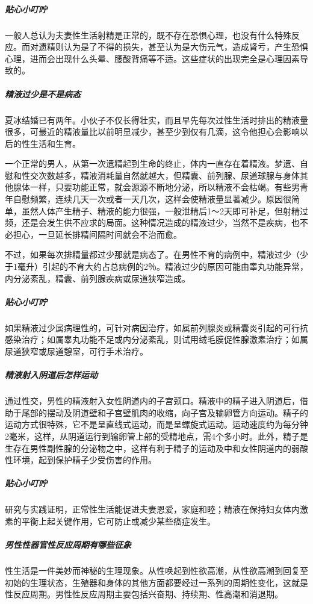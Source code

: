 \subparagraph{贴心小叮咛}

一般人总认为夫妻性生活射精是正常的，既不存在恐惧心理，也没有什么特殊反应。而对遗精则认为是了不得的损失，甚至认为是大伤元气，造成肾亏，产生恐惧心理，进而会出现什么头晕、腰酸背痛等不适。这些症状的出现完全是心理因素导致的。

\subparagraph{精液过少是不是病态}

夏冰结婚已有两年。小伙子不仅长得壮实，而且早先每次过性生活时排出的精液量很多，可最近的精液量比以前明显减少，甚至少到仅有几滴，这令他担心会影响以后的性生活和生育。

一个正常的男人，从第一次遗精起到生命的终止，体内一直存在着精液。梦遗、自慰和性交次数越多，精液消耗量自然就越大，但精囊、前列腺、尿道球腺与身体其他腺体一样，只要功能正常，就会源源不断地分泌，所以精液不会枯竭。有些男青年自慰频繁，连续几天一次或者一天几次，这样会使精液量显著减少。原因很简单，虽然人体产生精子、精液的能力很强，一般泄精后1～2天即可补足，但射精过频，还是会发生供不应求的局面。这种情况造成的精液过少，当然不是疾病，也不必担心，一旦延长排精间隔时间就会不治而愈。

不过，如果每次排精量都过少那就是病态了。在男性不育的病例中，精液过少（少于1毫升）引起的不育大约占总病例的2％。精液过少的原因可能由睾丸功能异常，内分泌紊乱，精囊、前列腺疾病或尿道狭窄造成。

\subparagraph{贴心小叮咛}

如果精液过少属病理性的，可针对病因治疗，如属前列腺炎或精囊炎引起的可行抗感染治疗；如属睾丸功能不足或内分泌紊乱，则试用绒毛膜促性腺激素治疗；如属尿道狭窄或尿道憩室，可行手术治疗。

\subparagraph{精液射入阴道后怎样运动}

通过性交，男性的精液射入女性阴道内的子宫颈口。精液中的精子进入阴道后，借助于尾部的摆动及阴道壁和子宫壁肌肉的收缩，向子宫及输卵管方向运动。精子的运动方式很特殊，它不是呈直线式运动，而是呈螺旋式运动。运动速度约为每分钟2毫米，这样，从阴道运行到输卵管上部的受精地点，需4个多小时。此外，精子是生存在男性副性腺的分泌物之中，这样有利于精子的运动及中和女性阴道内的弱酸性环境，起到保护精子少受伤害的作用。

\subparagraph{贴心小叮咛}

研究与实践证明，正常性生活能促进夫妻恩爱，家庭和睦；精液在保持妇女体内激素的平衡上起关键作用，它可防止或减少某些癌症发生。

\subparagraph{男性性器官性反应周期有哪些征象}

性生活是一件美妙而神秘的生理现象。从性唤起到性欲高潮，从性欲高潮到回复至初始的生理状态，生殖器和身体的其他方面都要经过一系列的周期性变化，这就是性反应周期。男性性反应周期主要包括兴奋期、持续期、性高潮和消退期。

